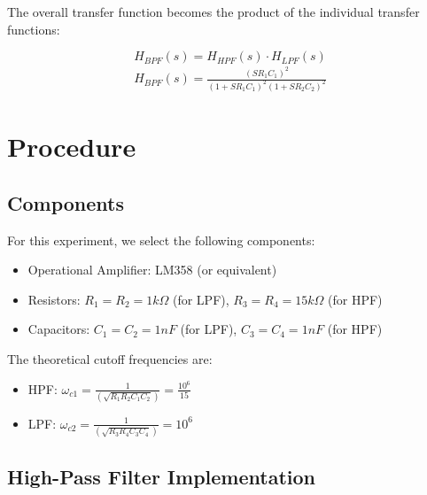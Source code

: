 \documentclass{article}
\begin{document}
The overall transfer function becomes the product of the individual transfer functions:

\[
H_{BPF}(s) = H_{HPF}(s) \cdot H_{LPF}(s)
\]
\begin{align*}
    H_{BPF}(s) = \frac{{(SR_1C_1)}^2}{(1 + SR_1C_1)^2(1 + SR_2C_2)^2}
\end{align*}

\section*{Procedure}

\subsection*{Components}

For this experiment, we select the following components:
\begin{itemize}
\item Operational Amplifier: LM358 (or equivalent)
\item Resistors: $R_1 = R_2 = 1k\Omega$ (for LPF),  $R_3 = R_4 = 15k\Omega$ (for HPF)
\item Capacitors: $C_1 = C_2 = 1nF$ (for LPF), $C_3 = C_4 = 1nF$ (for HPF)
\end{itemize}

The theoretical cutoff frequencies are:
\begin{itemize}
\item HPF: $\omega_{c1} = \frac{1}{(\sqrt{R_1R_2C_1C_2})} = \frac{10^6}{15}$ 
\item LPF: $\omega_{c2} = \frac{1}{(\sqrt{R_3R_4C_3C_4})} = 10^6$
\end{itemize}

\subsection*{High-Pass Filter Implementation}
\end{document}
